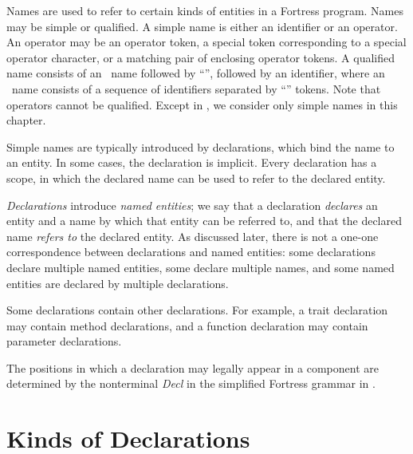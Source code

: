 
Names are used to refer to certain kinds of entities
in a Fortress program.
Names may be simple or qualified.
A simple name is either an identifier or an operator.
An operator may be an operator token,
a special token corresponding to a special operator character,
or a matching pair of enclosing operator tokens.
A qualified name consists of an \apiN\ name
followed by ``'',
followed by an identifier,
where an \apiN\ name consists of a sequence of identifiers
separated by ``'' tokens.
Note that operators cannot be qualified.
Except in ,
we consider only simple names in this chapter.

Simple names are typically introduced by declarations,
which bind the name to an entity.
In some cases,
the declaration is implicit.
Every declaration has a scope,
in which the declared name can be used to refer to the declared entity.

\emph{Declarations} introduce \emph{named entities};
we say that a declaration \emph{declares} an entity
and a name by which that entity can be referred to,
and that the declared name \emph{refers to} the declared entity.
As discussed later, there is not a one-one correspondence
between declarations and named entities:
some declarations declare multiple named entities,
some declare multiple names,
and some named entities are declared by multiple declarations.

Some declarations contain other declarations.
For example, a trait declaration may contain method declarations,
and a function declaration may contain parameter declarations.

The positions in which a declaration may legally
appear in a component are determined by the nonterminal \emph{Decl}
in the simplified Fortress grammar in .


\section{Kinds of Declarations}

